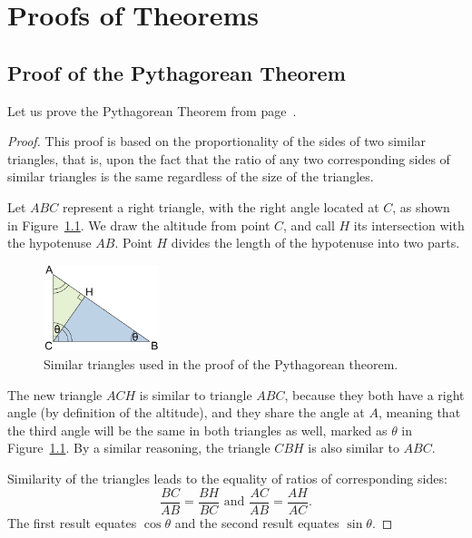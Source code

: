 % 
\chapter{Proofs of Theorems}
\label{app:proofs}

\section{Proof of the Pythagorean Theorem}

Let us prove the Pythagorean Theorem from page~\pageref{thm:pythagoras}.

\begin{proof}
This proof is based on the proportionality of the sides of two similar triangles, that is, upon the fact that the ratio of any two corresponding sides of similar triangles is the same regardless of the size of the triangles.

Let $ABC$ represent a right triangle, with the right angle located at $C$, as shown in Figure~\ref{fig:Pythagoras}. We draw the altitude from point $C$, and call $H$ its intersection with the hypotenuse $AB$. Point $H$ divides the length of the hypotenuse into two parts. 

\begin{figure}[htb]
	\centering
		\includegraphics[width=0.3\textwidth]{figures/Pythagoras.png}
	\caption{Similar triangles used in the proof of the Pythagorean theorem.}
	\label{fig:Pythagoras}
\end{figure}

The new triangle $ACH$ is similar to triangle $ABC$, because they both have a right angle (by definition of the altitude), and they share the angle at $A$, meaning that the third angle will be the same in both triangles as well, marked as $\theta$ in Figure~\ref{fig:Pythagoras}. By a similar reasoning, the triangle $CBH$ is also similar to $ABC$. 

Similarity of the triangles leads to the equality of ratios of corresponding sides:
\begin{equation}
    \frac{BC}{AB}=\frac{BH}{BC} \text{ and } \frac{AC}{AB}=\frac{AH}{AC}.
\end{equation}
The first result equates $\cos \theta$ and the second result equates $\sin \theta$.


\end{proof}
